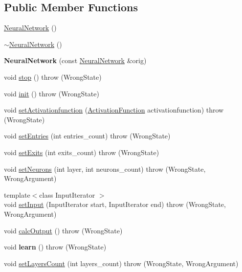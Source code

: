 \subsection*{\-Public \-Member \-Functions}
\begin{DoxyCompactItemize}
\item 
\hyperlink{class_neural_network_ade5d1724706351407fdf6acf613ac8c8}{\-Neural\-Network} ()
\item 
\hyperlink{class_neural_network_a4c1e3cc6dc0114260c17f0a5ea8e9981}{$\sim$\-Neural\-Network} ()
\item 
\hypertarget{class_neural_network_a4ce7e819f755461926a92668aab811e2}{{\bfseries \-Neural\-Network} (const \hyperlink{class_neural_network}{\-Neural\-Network} \&orig)}\label{class_neural_network_a4ce7e819f755461926a92668aab811e2}

\item 
void \hyperlink{class_neural_network_aaf6e7c89c53dcc4f4b2c71f8d25a9741}{stop} ()  throw (\-Wrong\-State)
\item 
void \hyperlink{class_neural_network_aa83131836c86cd3e60ddb46a17b164a5}{init} ()  throw (\-Wrong\-State)
\item 
void \hyperlink{class_neural_network_acfdd9905e047fff1b40e4cd358160f6e}{set\-Activationfunction} (\hyperlink{class_activation_function}{\-Activation\-Function} activationfunction)  throw (\-Wrong\-State)
\item 
void \hyperlink{class_neural_network_a705286b62e4d1d11310f997dadd31fa8}{set\-Entries} (int entries\-\_\-count)  throw (\-Wrong\-State)
\item 
void \hyperlink{class_neural_network_a18912fbb8068bfb301d6e2462c9f8a31}{set\-Exits} (int exits\-\_\-count)  throw (\-Wrong\-State)
\item 
void \hyperlink{class_neural_network_ab3c70e006390624a5b9bd2c933b8af56}{set\-Neurons} (int layer, int neurons\-\_\-count)  throw (\-Wrong\-State, Wrong\-Argument)
\item 
{\footnotesize template$<$class Input\-Iterator $>$ }\\void \hyperlink{class_neural_network_aaf64536a908b15b76faa8e19216d9219}{set\-Input} (\-Input\-Iterator start, \-Input\-Iterator end)  throw (\-Wrong\-State, Wrong\-Argument)
\item 
void \hyperlink{class_neural_network_a7f03c156227f54548f92ea1cd686a7da}{calc\-Output} ()  throw (\-Wrong\-State)
\item 
\hypertarget{class_neural_network_a88c90e7bb7cfe85fb4f22bd4fbb2fe51}{void {\bfseries learn} ()  throw (\-Wrong\-State)}\label{class_neural_network_a88c90e7bb7cfe85fb4f22bd4fbb2fe51}

\item 
void \hyperlink{class_neural_network_a3ef0490ade6f9efff49501132a12fd18}{set\-Layers\-Count} (int layers\-\_\-count)  throw (\-Wrong\-State, Wrong\-Argument)
\end{DoxyCompactItemize}


